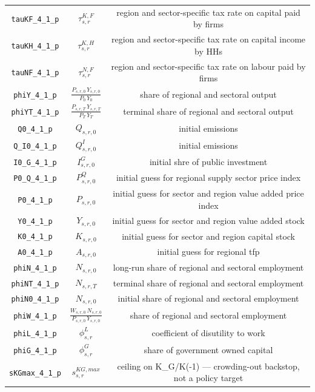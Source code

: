 \begin{center}
\begin{longtable}{ccc}
\texttt{tauKF\_4\_1\_p} & ${\tau^{K,F}_{s,r}}$ & region and sector-specific tax rate on capital paid by firms\\
\texttt{tauKH\_4\_1\_p} & ${\tau^{K,H}_{s,r}}$ & region and sector-specific tax rate on capital income by HHs\\
\texttt{tauNF\_4\_1\_p} & ${\tau^{N,F}_{s,r}}$ & region and sector-specific tax rate on labour paid by firms\\
\texttt{phiY\_4\_1\_p} & $\frac{P_{s,r,0} \, Y_{s,r,0}}{P_{0} \, Y_{0}}$ & share of regional and sectoral output\\
\texttt{phiYT\_4\_1\_p} & $\frac{P_{s,r,T} \, Y_{s,r,T}}{P_{T} \, Y_{T}}$ & terminal share of regional and sectoral output\\
\texttt{Q0\_4\_1\_p} & ${Q_{s,r,0}}$ & initial emissions\\
\texttt{Q\_I0\_4\_1\_p} & ${Q^I_{s,r,0}}$ & initial emissions\\
\texttt{I0\_G\_4\_1\_p} & ${I^G_{s,r,0}}$ & initial shre of public investment\\
\texttt{P0\_Q\_4\_1\_p} & ${P^Q_{s,r,0}}$ & initial guess for regional supply sector price index\\
\texttt{P0\_4\_1\_p} & ${P_{s,r,0}}$ & initial guess for sector and region value added price index\\
\texttt{Y0\_4\_1\_p} & ${Y_{s,r,0}}$ & initial guess for sector and region value added stock\\
\texttt{K0\_4\_1\_p} & ${K_{s,r,0}}$ & initial guess for sector and region capital stock\\
\texttt{A0\_4\_1\_p} & ${A_{s,r,0}}$ & initial guess for regional tfp\\
\texttt{phiN\_4\_1\_p} & ${N_{s,r,0}}$ & long-run share of regional and sectoral employment\\
\texttt{phiNT\_4\_1\_p} & ${N_{s,r,T}}$ & terminal share of regional and sectoral employment\\
\texttt{phiN0\_4\_1\_p} & ${N_{s,r,0}}$ & initial share of regional and sectoral employment\\
\texttt{phiW\_4\_1\_p} & $\frac{W_{s,r,0} \, N_{s,r,0}}{P_{s,r,0} \, Y_{s,r,0}}$ & share of regional and sectoral employment\\
\texttt{phiL\_4\_1\_p} & ${\phi^{L}_{s,r}}$ & coefficient of disutility to work\\
\texttt{phiG\_4\_1\_p} & ${\phi^{G}_{s,r}}$ & share of government owned capital\\
\texttt{sKGmax\_4\_1\_p} & ${s^{KG,max}_{s,r}}$ & ceiling on K\_G/K(-1) — crowding-out backstop, not a policy target\\

\end{longtable}
\end{center}
